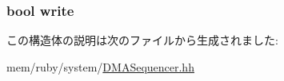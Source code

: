 \label{structDMARequest_aa96199a298e3cb816b3b9fd242a60c91}
\hypertarget{structDMARequest_ab4d8d1259f524270d625ab8933700d27}{
\subsubsection[{write}]{\setlength{\rightskip}{0pt plus 5cm}bool {\bf write}}}
\label{structDMARequest_ab4d8d1259f524270d625ab8933700d27}


この構造体の説明は次のファイルから生成されました:\begin{DoxyCompactItemize}
\item 
mem/ruby/system/\hyperlink{DMASequencer_8hh}{DMASequencer.hh}\end{DoxyCompactItemize}
